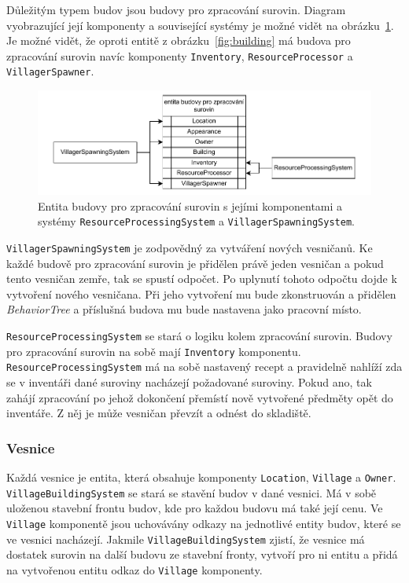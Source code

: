 Důležitým typem budov jsou budovy pro zpracování surovin. Diagram vyobrazující její komponenty a související systémy je možné vidět na obrázku~\ref{fig:res_building}. Je možné vidět, že oproti entitě z obrázku~\ref{fig:building} má budova pro zpracování surovin navíc komponenty \texttt{Inventory}, \texttt{ResourceProcessor} a \texttt{VillagerSpawner}.

\begin{figure}[!htb]
  \centering
  \includegraphics[width=1.0\linewidth]{img/resource_building.pdf}
  \caption{Entita budovy pro zpracování surovin s jejími komponentami a systémy \texttt{ResourceProcessingSystem} a \texttt{VillagerSpawningSystem}.}
  \label{fig:res_building}
\end{figure}

\texttt{VillagerSpawningSystem} je zodpovědný za vytváření nových vesničanů. Ke každé budově pro zpracování surovin je přidělen právě jeden vesničan a pokud tento vesničan zemře, tak se spustí odpočet. Po uplynutí tohoto odpočtu dojde k vytvoření nového vesničana. Při jeho vytvoření mu bude zkonstruován a přidělen \textit{BehaviorTree} a příslušná budova mu bude nastavena jako pracovní místo.

\texttt{ResourceProcessingSystem} se stará o logiku kolem zpracování surovin. Budovy pro zpracování surovin na sobě mají \texttt{Inventory} komponentu. \texttt{ResourceProcessingSystem} má na sobě nastavený recept a pravidelně nahlíží zda se v inventáři dané suroviny nacházejí požadované suroviny. Pokud ano, tak zahájí zpracování po jehož dokončení přemístí nově vytvořené předměty opět do inventáře. Z něj je může vesničan převzít a odnést do skladiště.

\subsubsection{Vesnice}
Každá vesnice je entita, která obsahuje komponenty \texttt{Location}, \texttt{Village} a \texttt{Owner}. \texttt{VillageBuildingSystem} se stará se stavění budov v dané vesnici. Má v sobě uloženou stavební frontu budov, kde pro každou budovu má také její cenu. Ve \texttt{Village} komponentě jsou uchovávány odkazy na jednotlivé entity budov, které se ve vesnici nacházejí. Jakmile \texttt{VillageBuildingSystem} zjistí, že vesnice má dostatek surovin na další budovu ze stavební fronty, vytvoří pro ni entitu a přidá na vytvořenou entitu odkaz do \texttt{Village} komponenty.

